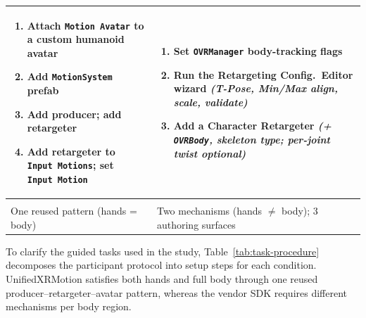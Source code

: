 \documentclass[runningheads]{llncs}
\newenvironment{cellsteps}
  {\begin{enumerate}[leftmargin=*,labelsep=0.4em,labelindent=0pt,
       topsep=0pt,partopsep=0pt,itemsep=1pt,parsep=0pt,label=\arabic*.]}
  {\end{enumerate}}
\newcommand{\radd}[1]{\textcolor{revadd}{#1}}
\newcommand{\radd}[1]{#1}
\begin{document}
\begin{table}[t]
\begin{tabularx}{\textwidth}{@{}>{\raggedright\arraybackslash}X >{\raggedright\arraybackslash}X@{}}
		\addlinespace[2pt]
		\begin{cellsteps}
		     \item Attach \texttt{Motion\,Avatar} to a custom humanoid avatar
		     \item Add \texttt{MotionSystem} prefab
		     \item Add producer; add retargeter
		     \item Add retargeter to \texttt{Input\,Motions}; set \texttt{Input\,Motion}
		   \end{cellsteps}
		 & \begin{cellsteps}
		     \item Set \texttt{OVRManager} body-tracking flags
		     \item Run the Retargeting Config.\ Editor wizard \textit{(T-Pose, Min/Max align, scale, validate)}
		     \item Add a Character Retargeter \textit{(+ \texttt{OVRBody}, skeleton type; per-joint twist optional)}
		   \end{cellsteps} \\
		\midrule
		\multicolumn{2}{@{}l}{\textbf{Pattern}} \\
		\addlinespace[2pt]
		One reused pattern (hands = body) & Two mechanisms (hands $\neq$ body); 3 authoring surfaces \\
		\bottomrule
	\end{tabularx}
\end{table}

\radd{
	To clarify the guided tasks used in the study, Table~\ref{tab:task-procedure}
	decomposes the participant protocol into setup steps for each condition.
	UnifiedXRMotion satisfies both hands and full body through one reused
	producer--retargeter--avatar pattern, whereas the vendor SDK requires different
	mechanisms per body region.
}
\end{document}

